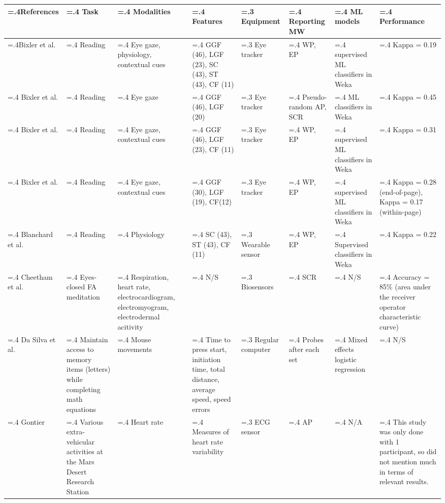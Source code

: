 \begin{tabularx}{\textheight}{|>{\hsize=.4\hsize}X|>{\hsize=.4\hsize}X|>{\hsize=.4\hsize}X|>{\hsize=.4\hsize}X|>{\hsize=.3\hsize}X|>{\hsize=.4\hsize}X|>{\hsize=.4\hsize}X|>{\hsize=.4\hsize}X}
    \hline
    References & Task & Modalities & Features & Equipment & Reporting MW & ML models & Performance \\
     \hline
     \hline
     Bixler et al. \cite{Bixler2015AutomaticPhysiology} & Reading & Eye gaze, physiology, contextual cues & GGF (46), LGF (23), SC (43), ST (43), CF (11)  & Eye tracker & WP, EP & 13 supervised ML classifiers in Weka & Kappa = 0.19\\
     \hline
     Bixler et al. \cite{Bixler2015AutomaticAwareness} & Reading & Eye gaze & GGF (46), LGF (20) & Eye tracker & Pseudo-random AP, SCR & 10 ML classifiers in Weka & Kappa = 0.45\\
     \hline
     Bixler et al. \cite{Bixler2016AutomaticReading} & Reading & Eye gaze, contextual cues & GGF (46), LGF (23), CF (11) & Eye tracker & WP, EP & 20 supervised ML classifiers in Weka & Kappa = 0.31\\
     \hline
     Bixler et al. \cite{Bixler2014TowardWandering} & Reading & Eye gaze, contextual cues & GGF (30), LGF (19), CF(12) & Eye tracker & WP, EP & 20 supervised ML classifiers in Weka & Kappa = 0.28 (end-of-page), Kappa = 0.17 (within-page)\\
     \hline
     Blanchard et al. \cite{Blanchard2014AutomatedLearning} & Reading & Physiology & SC (43), ST (43), CF (11) & Wearable sensor & WP, EP & Supervised classifiers in Weka & Kappa = 0.22\\
     \hline
     Cheetham et al. \cite{Cheetham2016AutomatedApplication} & Eyes-closed FA meditation & Respiration, heart rate, electrocardiogram, electromyogram, electrodermal acitivity & N/S & Biosensors & SCR & N/S & Accuracy = 85\% (area under the receiver operator characteristic curve)\\
     \hline
     Da Silva et al. \cite{DaSilva2018WanderingWandering} & Maintain access to memory items (letters) while completing math equations & Mouse movements & Time to press start, initiation time, total distance, average speed, speed errors & Regular computer & Probes after each set & Mixed effects logistic regression & N/S\\
     \hline
     Gontier \cite{Gontier2016HowEnvironment} & Various extra-vehicular activities at the Mars Desert Research Station & Heart rate & Measures of heart rate variability & ECG sensor & AP & N/A & This study was only done with 1 participant, so did not mention much in terms of relevant results. \\

\end{tabularx}

